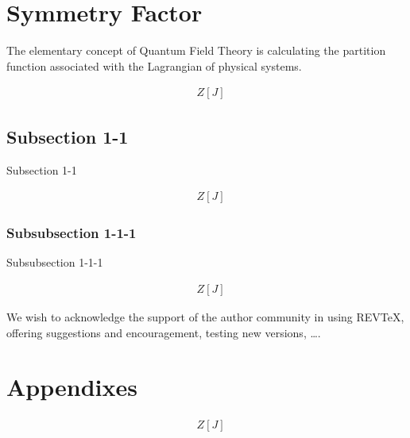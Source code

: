 \documentclass[%
 reprint,
 amsmath,amssymb,
 aps,
]{revtex4-2}
\numberwithin{equation}{section}
\begin{document}
\maketitle


\section{\label{sec:level1} Symmetry Factor }
  The elementary concept of Quantum Field Theory is calculating the 
  partition function associated with the Lagrangian of physical systems.
  
  \begin{align}
    &Z[J]
  \end{align}
  
  \subsection{\label{sec:level2} Subsection 1-1}
  
  Subsection 1-1
  
  \begin{align}
    &Z[J]
  \end{align}
  
  \subsubsection{Subsubsection 1-1-1}
  
  Subsubsection 1-1-1

  \begin{align}
    &Z[J]
  \end{align}
  

\begin{acknowledgments}
We wish to acknowledge the support of the author community in using
REV\TeX{}, offering suggestions and encouragement, testing new versions,
\dots.
\end{acknowledgments}


\appendix

\section{Appendixes}

\begin{align}
  &Z[J]
\end{align}
\end{document}
